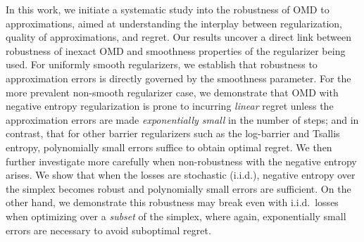 \documentclass[10pt]{article}
\theoremstyle{definition}
\theoremstyle{remark}
\begin{document}
In this work, we initiate a systematic study into the robustness of OMD to approximations, aimed at understanding the interplay between regularization, quality of approximations, and regret.
Our results uncover a direct link between robustness of inexact OMD and smoothness properties of the regularizer being used.
For uniformly smooth regularizers, we establish that robustness to approximation errors is directly governed by the smoothness parameter. For the more prevalent non-smooth regularizer case, we demonstrate that OMD with negative entropy regularization is prone to incurring \emph{linear} regret unless the approximation errors are made \emph{exponentially small} in the number of steps; and in contrast, that for other barrier regularizers such as the log-barrier and Tsallis entropy, polynomially small errors suffice to obtain optimal regret.
We then further investigate more carefully when non-robustness with the negative entropy arises. We show that when the losses are stochastic (i.i.d.), negative entropy over the simplex becomes robust and polynomially small errors are sufficient. On the other hand, we demonstrate this robustness may break even with i.i.d.\ losses when optimizing over a \emph{subset} of the simplex, where again, exponentially small errors are necessary to avoid suboptimal regret.  
\end{document}
